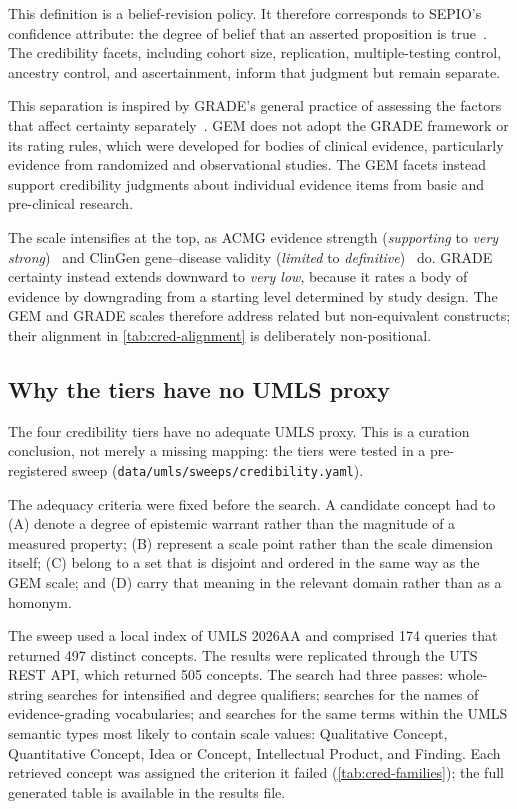This definition is a belief-revision policy. It therefore corresponds to
SEPIO's confidence attribute: the degree of belief that an asserted
proposition is true~\cite{sepio}. The credibility facets, including cohort
size, replication, multiple-testing control, ancestry control, and
ascertainment, inform that judgment but remain separate.

This separation is inspired by GRADE's general practice of assessing the
factors that affect certainty separately~\cite{grade2008}. GEM does not
adopt the GRADE framework or its rating rules, which were developed for
bodies of clinical evidence, particularly evidence from randomized and
observational studies. The GEM facets instead support credibility judgments
about individual evidence items from basic and pre-clinical research.

The scale intensifies at the top, as ACMG evidence strength
(\emph{supporting} to \emph{very strong})~\cite{acmg2015} and ClinGen
gene--disease validity (\emph{limited} to \emph{definitive})~\cite{clingen2018}
do. GRADE certainty instead extends downward to \emph{very low}, because it
rates a body of evidence by downgrading from a starting level determined by
study design. The GEM and GRADE scales therefore address related but
non-equivalent constructs; their alignment in \cref{tab:cred-alignment} is
deliberately non-positional.

\subsection{Why the tiers have no UMLS proxy}
\label{sec:supp-credibility-umls}

The four credibility tiers have no adequate UMLS proxy. This is a curation
conclusion, not merely a missing mapping: the tiers were tested in a
pre-registered sweep (\texttt{data/umls/sweeps/credibility.yaml}).

The adequacy criteria were fixed before the search. A candidate concept had
to (A) denote a degree of epistemic warrant rather than the magnitude of a
measured property; (B) represent a scale point rather than the scale
dimension itself; (C) belong to a set that is disjoint and ordered in the
same way as the GEM scale; and (D) carry that meaning in the relevant domain
rather than as a homonym.

The sweep used a local index of UMLS 2026AA and comprised 174 queries that
returned 497 distinct concepts. The results were replicated through the UTS
REST API, which returned 505 concepts. The search had three passes:
whole-string searches for intensified and degree qualifiers; searches for
the names of evidence-grading vocabularies; and searches for the same terms
within the UMLS semantic types most likely to contain scale values:
Qualitative Concept, Quantitative Concept, Idea or Concept, Intellectual
Product, and Finding. Each
retrieved concept was assigned the criterion it failed
(\cref{tab:cred-families}); the full generated table is available in the
results file.

